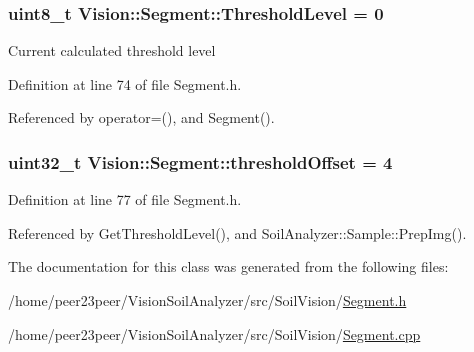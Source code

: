 \subsubsection[{Threshold\+Level}]{\setlength{\rightskip}{0pt plus 5cm}uint8\+\_\+t Vision\+::\+Segment\+::\+Threshold\+Level = 0}\label{class_vision_1_1_segment_a44f45a7d08ba6fed38e5c31bc9108291}
Current calculated threshold level 

Definition at line 74 of file Segment.\+h.



Referenced by operator=(), and Segment().

\hypertarget{class_vision_1_1_segment_a1338fc42ead26c6b1dd661f4281f5674}{}
\subsubsection[{threshold\+Offset}]{\setlength{\rightskip}{0pt plus 5cm}uint32\+\_\+t Vision\+::\+Segment\+::threshold\+Offset = 4}\label{class_vision_1_1_segment_a1338fc42ead26c6b1dd661f4281f5674}


Definition at line 77 of file Segment.\+h.



Referenced by Get\+Threshold\+Level(), and Soil\+Analyzer\+::\+Sample\+::\+Prep\+Img().



The documentation for this class was generated from the following files\+:\begin{DoxyCompactItemize}
\item 
/home/peer23peer/\+Vision\+Soil\+Analyzer/src/\+Soil\+Vision/\hyperlink{_segment_8h}{Segment.\+h}\item 
/home/peer23peer/\+Vision\+Soil\+Analyzer/src/\+Soil\+Vision/\hyperlink{_segment_8cpp}{Segment.\+cpp}\end{DoxyCompactItemize}
